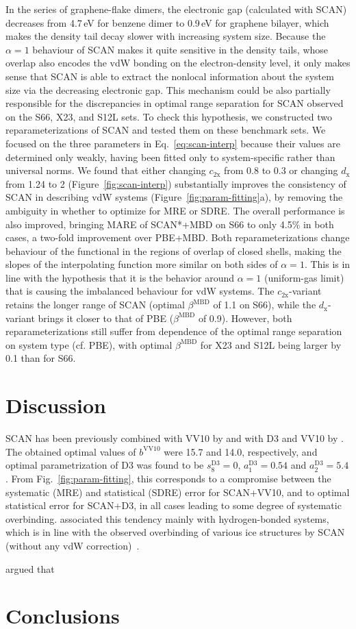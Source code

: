 In the series of graphene-flake dimers, the electronic gap (calculated with SCAN) decreases from 4.7\,eV for benzene dimer to 0.9\,eV for graphene bilayer, which makes the density tail decay slower with increasing system size.
Because the $\alpha=1$ behaviour of SCAN makes it quite sensitive in the density tails, whose overlap also encodes the vdW bonding on the electron-density level, it only makes sense that SCAN is able to extract the nonlocal information about the system size via the decreasing electronic gap.
This mechanism could be also partially responsible for the discrepancies in optimal range separation for SCAN observed on the S66, X23, and S12L sets.
To check this hypothesis, we constructed two reparameterizations of SCAN and tested them on these benchmark sets.
We focused on the three parameters in Eq.~\ref{eq:scan-interp} because their values are determined only weakly, having been fitted only to system-specific rather than universal norms.
We found that either changing $c_\mathrm{2x}$ from 0.8 to 0.3 or changing $d_\mathrm x$ from 1.24 to 2 (Figure~\ref{fig:scan-interp}) substantially improves the consistency of SCAN in describing vdW systems (Figure~\ref{fig:param-fitting}a), by removing the ambiguity in whether to optimize for MRE or SDRE\@.
The overall performance is also improved, bringing MARE of SCAN*+MBD on S66 to only 4.5\% in both cases, a two-fold improvement over PBE+MBD\@.
Both reparameterizations change behaviour of the functional in the regions of overlap of closed shells, making the slopes of the interpolating function more similar on both sides of $\alpha=1$.
This is in line with the hypothesis that it is the behavior around $\alpha=1$ (uniform-gas limit) that is causing the imbalanced behaviour for vdW systems.
The $c_\mathrm{2x}$-variant retains the longer range of SCAN (optimal $\beta^\text{MBD}$ of 1.1 on S66), while the $d_\mathrm x$-variant brings it closer to that of PBE ($\beta^\text{MBD}$ of 0.9).
However, both reparameterizations still suffer from dependence of the optimal range separation on system type (cf. PBE), with optimal $\beta^\text{MBD}$ for X23 and S12L being larger by 0.1 than for S66.

\section{Discussion}

SCAN has been previously combined with VV10 by \citet{PengPRX16} and with D3 and VV10 by \citet{BrandenburgPRB16}.
The obtained optimal values of $b^\text{VV10}$ were 15.7 and 14.0, respectively, and optimal parametrization of D3 was found to be $s_8^\text{D3}=0$, $a_1^\text{D3}=0.54$ and $a_2^\text{D3}=5.4$.
From Fig.~\ref{fig:param-fitting}, this corresponds to a compromise between the systematic (MRE) and statistical (SDRE) error for SCAN+VV10, and to optimal statistical error for SCAN+D3, in all cases leading to some degree of systematic overbinding.
\citet{BrandenburgPRB16} associated this tendency mainly with hydrogen-bonded systems, which is in line with the observed overbinding of various ice structures by SCAN (without any vdW correction)~\cite{ChenPRB16}.

\citet{PengPRX16} argued that 

\section{Conclusions}
